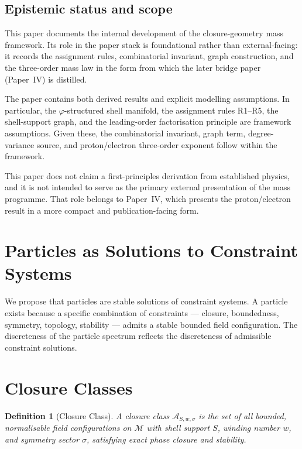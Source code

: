 \documentclass[12pt]{article}
\newtheorem{definition}[theorem]{Definition}
\newcommand{\Mcal}{\mathcal{M}}
\newcommand{\Acal}{\mathcal{A}}
\newcommand{\phig}{\varphi}
\begin{document}
\subsection*{Epistemic status and scope}

This paper documents the internal development of the closure-geometry mass framework. Its role in the paper stack is foundational rather than external-facing: it records the assignment rules, combinatorial invariant, graph construction, and the three-order mass law in the form from which the later bridge paper (Paper~IV) is distilled.

The paper contains both derived results and explicit modelling assumptions. In particular, the $\phig$-structured shell manifold, the assignment rules R1--R5, the shell-support graph, and the leading-order factorisation principle are framework assumptions. Given these, the combinatorial invariant, graph term, degree-variance source, and proton/electron three-order exponent follow within the framework.

This paper does not claim a first-principles derivation from established physics, and it is not intended to serve as the primary external presentation of the mass programme. That role belongs to Paper~IV, which presents the proton/electron result in a more compact and publication-facing form.

\section{Particles as Solutions to Constraint Systems}\label{sec:philosophy}

We propose that particles are stable solutions of constraint systems. A particle exists because a specific combination of constraints --- closure, boundedness, symmetry, topology, stability --- admits a stable bounded field configuration. The discreteness of the particle spectrum reflects the discreteness of admissible constraint solutions.

\section{Closure Classes}\label{sec:classes}

\begin{definition}[Closure Class]\label{def:class}
A closure class $\Acal_{S,w,\sigma}$ is the set of all bounded, normalisable field configurations on $\Mcal$ with shell support $S$, winding number $w$, and symmetry sector $\sigma$, satisfying exact phase closure and stability.
\end{definition}
\end{document}
